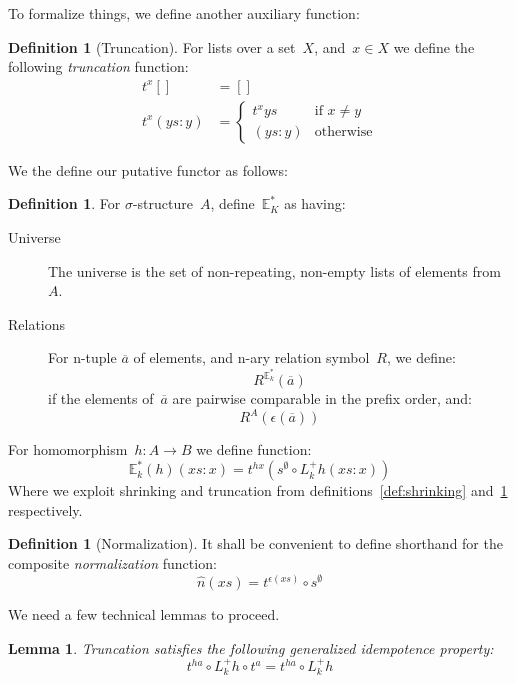 \documentclass{article}
\theoremstyle{plain}
\newtheorem{lemma}[theorem]{Lemma}
\theoremstyle{definition}
\newtheorem{definition}[theorem]{Definition}
\theoremstyle{remark}
\numberwithin{theorem}{section}
\begin{document}
To formalize things, we define another auxiliary function:
\begin{definition}[Truncation]
\label{def:truncation}
For lists over a set~$X$, and~$x \in X$ we define the following \emph{truncation} function:
\begin{align*}
    t^x [] &= []\\
    t^x (ys:y) &=
    \begin{cases}
    t^x ys &\mbox{if } x \neq y\\
    (ys:y) &\mbox{otherwise}
    \end{cases}
\end{align*}
\end{definition}
We the define our putative functor as follows:
\begin{definition}
For $\sigma$-structure~$A$, define~$\mathbb{E}^*_K$ as having:
\begin{description}
\item[Universe] The universe is the set of non-repeating, non-empty lists of elements from~$A$.
\item[Relations] For n-tuple $\overline{a}$ of elements, and n-ary relation symbol~$R$, we define:
\begin{equation*}
    R^{\mathbb{E}^*_k}(\overline{a})
\end{equation*}
if the elements of~$\overline{a}$ are pairwise comparable in the prefix order, and:
\begin{equation*}
    R^A(\epsilon(\overline{a}))
\end{equation*}
\end{description}
For homomorphism~$h : A \rightarrow B$ we define function:
\begin{equation*}
    \mathbb{E}^*_k(h)(xs:x) = t^{h x}(s^\emptyset \circ L^+_k h (xs:x))
\end{equation*}
Where we exploit shrinking and truncation from definitions~\ref{def:shrinking} and~\ref{def:truncation} respectively.
\end{definition}
\begin{definition}[Normalization]
It shall be convenient to define shorthand for the composite \emph{normalization} function:
\begin{equation*}
    \hat{n}(xs) = t^{\epsilon(xs)} \circ s^\emptyset
\end{equation*}
\end{definition}
We need a few technical lemmas to proceed.
\begin{lemma}
\label{lem:t-idem}
Truncation satisfies the following generalized idempotence property:
\begin{equation*}
t^{h a} \circ L^+_k h \circ t^a = t^{h a} \circ L^+_k h
\end{equation*}
\end{lemma}
\end{document}
